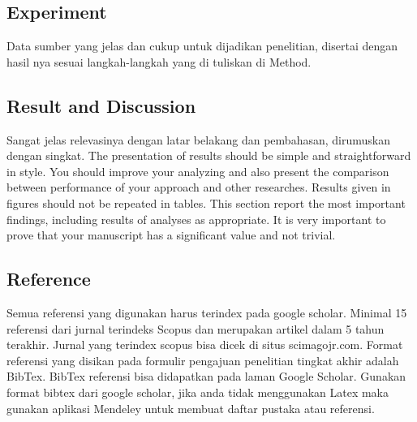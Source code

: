 \subsection{Experiment}
Data sumber yang jelas dan cukup untuk dijadikan penelitian, disertai dengan hasil nya sesuai langkah-langkah yang di tuliskan di Method.

\subsection{Result and Discussion}
Sangat jelas relevasinya dengan latar belakang dan pembahasan, dirumuskan dengan singkat. The presentation of results should be simple and straightforward in style. You should improve your analyzing and also present the comparison between performance of your approach and other researches. Results given in figures should not be repeated in tables. This section report the most important findings, including results of analyses as appropriate. It is very important to prove that your manuscript has a significant value and not trivial.

\subsection{Reference}
Semua  referensi  yang  digunakan  harus  terindex  pada  google  scholar.   Minimal  15 referensi dari jurnal terindeks Scopus dan merupakan artikel dalam 5 tahun terakhir. Jurnal yang terindex scopus bisa dicek di situs scimagojr.com.  Format referensi yang disikan  pada  formulir  pengajuan  penelitian  tingkat  akhir  adalah  BibTex.   BibTex referensi bisa didapatkan pada laman Google Scholar. Gunakan format bibtex dari google scholar, jika anda tidak menggunakan Latex maka gunakan aplikasi Mendeley untuk membuat daftar pustaka atau referensi.



